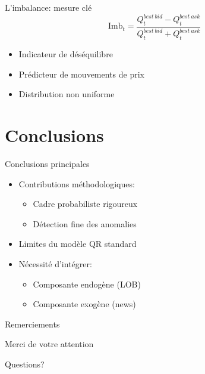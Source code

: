 \documentclass[aspectratio=169]{beamer}  %
\begin{document}
\begin{frame}{L'imbalance: mesure clé}
    \begin{equation*}
        \text{Imb}_t = \frac{Q^{best\ bid}_t-Q^{best\ ask}_t}{Q^{best\ bid}_t+Q^{best\ ask}_t}
    \end{equation*}
    \begin{itemize}
        \item Indicateur de déséquilibre
        \item Prédicteur de mouvements de prix
        \item Distribution non uniforme
    \end{itemize}
\end{frame}

\section{Conclusions}

\begin{frame}{Conclusions principales}
    \begin{itemize}
        \item Contributions méthodologiques:
        \begin{itemize}
            \item Cadre probabiliste rigoureux
            \item Détection fine des anomalies
        \end{itemize}
        \item Limites du modèle QR standard
        \item Nécessité d'intégrer:
        \begin{itemize}
            \item Composante endogène (LOB)
            \item Composante exogène (news)
        \end{itemize}
    \end{itemize}
\end{frame}

\begin{frame}{Remerciements}
    \begin{center}
        \Large Merci de votre attention
        \vspace{1cm}
        
        \normalsize
        Questions?
    \end{center}
\end{frame}
\end{document}
